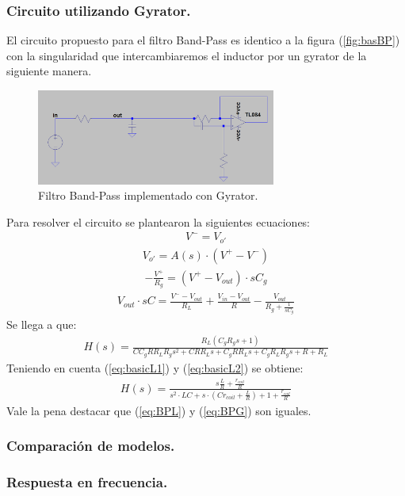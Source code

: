 \documentclass[a4paper]{article}
\begin{document}
\subsubsection{Circuito utilizando Gyrator.}
El circuito propuesto para el filtro Band-Pass es identico a la figura (\ref{fig:basBP}) con la singularidad que intercambiaremos el inductor por un gyrator de la siguiente manera.
\begin{figure}[H]	
	\centering
	\includegraphics[width=0.7\textwidth]{ImagenesEj2/gyrBP.PNG}
	\caption{Filtro Band-Pass implementado con Gyrator.}
	\label{fig:gyrBP}
\end{figure}
Para resolver el circuito se plantearon la siguientes ecuaciones:
\begin{align}V^- = V_{o'}\end{align}
\begin{align}V_{o'} = A(s)\cdot (V^+-V^-)\end{align}
\begin{align} -\frac{V^+}{R_g}=(V^+-V_{out})\cdot sC_g \end{align}
\begin{align}  V_{out}\cdot sC= \frac{V^--V_{out}}{R_L}+\frac{V_{in}-V_{out}}{R}-\frac{V_{out}}{R_g+\frac{1}{sC_g}}\end{align}
Se llega a que:
\begin{align}H(s)=\frac{R_{L} \left(C_{g} R_{g} s + 1\right)}{C C_{g} R R_{L} R_{g} s^{2} + C R R_{L} s + C_{g} R R_{L} s + C_{g} R_{L} R_{g} s + R + R_{L}}
\end{align}
Teniendo en cuenta (\ref{eq:basicL1}) y (\ref{eq:basicL2}) se obtiene:
\begin{align}H(s)=\frac{s\frac{L}{R}+\frac{r_{coil}}{R}}{s^2\cdot LC +s \cdot (Cr_{coil}+\frac{L}{R})+1+\frac{r_{coil}}{R}}
\label{eq:BPG}
\end{align}
Vale la pena destacar que (\ref{eq:BPL}) y (\ref{eq:BPG}) son iguales.
\subsubsection{Comparación de modelos.}
\subsubsection{Respuesta en frecuencia.}
\end{document}

